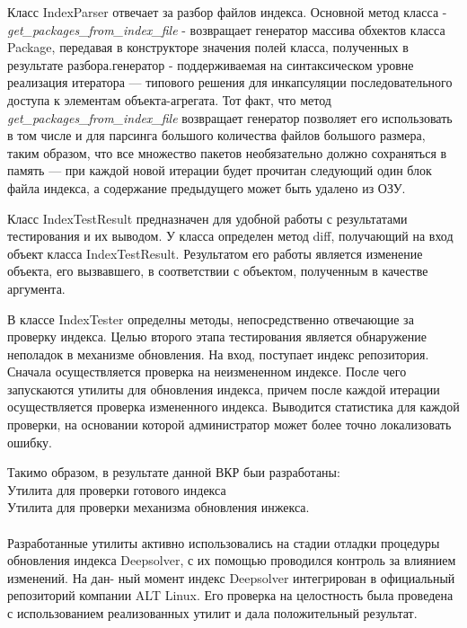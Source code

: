 \documentclass[a4paper]{article}
\begin{document}
Класс IndexParser отвечает за разбор файлов индекса. Основной метод класса 
- \textit{get\_packages\_from\_index\_file} - возвращает генератор массива 
обхектов класса Package, передавая в конструкторе значения полей класса, 
полученных в результате разбора.генератор - поддерживаемая на синтаксическом уровне 
реализация итератора --- типового решения для инкапсуляции последовательного 
доступа к элементам объекта-агрегата. 
Тот факт, что метод \textit{get\_packages\_from\_index\_file} возвращает генератор позволяет
его использовать в том числе и для парсинга большого количества файлов большого размера, 
таким образом, что все множество пакетов необязательно должно сохраняться в память ---
при каждой новой итерации будет прочитан следующий один блок файла индекса, 
а содержание предыдущего может быть удалено из ОЗУ.

Класс IndexTestResult предназначен для удобной работы с результатами тестирования 
и их выводом. У класса определен метод diff, получающий на вход объект класса IndexTestResult. 
Результатом его работы является изменение объекта, его вызвавшего, в соответствии
с объектом, полученным в качестве аргумента.

В классе IndexTester определны методы, непосредственно отвечающие за проверку индекса.
\newpage
Целью второго этапа тестирования является обнаружение неполадок в механизме 
обновления. На вход, поступает индекс репозитория. Сначала осуществляется 
проверка на неизмененном индексе. После чего запускаются
утилиты для обновления индекса, причем после каждой итерации осуществляется 
проверка измененного индекса. Выводится статистика для каждой проверки, 
на основании которой администратор может более точно локализовать ошибку.


\newpage
Такимо образом, в результате данной ВКР быи разработаны:\\
Утилита для проверки готового индекса\\
Утилита для проверки механизма обновления инжекса.\\
\\
Разработанные утилиты активно использовались на стадии отладки процедуры обновления
индекса Deepsolver, с их помощью проводился контроль за влиянием изменений. На дан-
ный момент индекс Deepsolver интегрирован в официальный репозиторий компании ALT Linux.
Его проверка на целостность была проведена с использованием реализованных утилит и дала
положительный результат.
\end{document}
